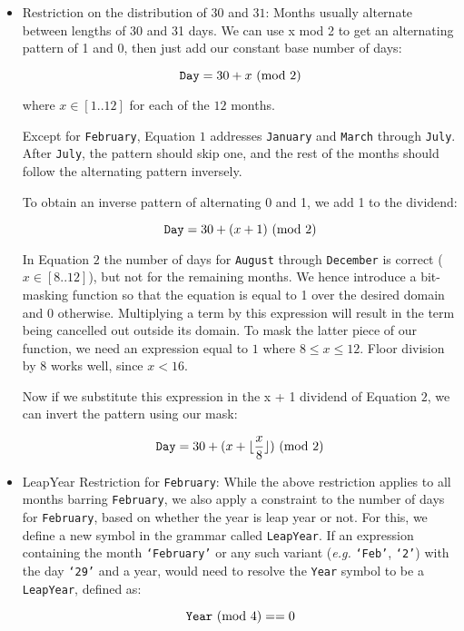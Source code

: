 \begin{itemize}
\item Restriction on the distribution of $30$ and $31$:
Months usually alternate between lengths of 30 and 31 days. We can use x mod 2 to get an alternating pattern of 1 and 0, then just add our constant base number of days:

\begin{equation}
\texttt{Day} = 30 + x \ (\text{mod}\ 2)
\end{equation}

where $x \in [1..12]$ for each of the $12$ months.

Except for \texttt{February}, Equation $1$ addresses \texttt{January} and \texttt{March} through \texttt{July}. After \texttt{July}, the pattern should skip one, and the rest of the months should follow the alternating pattern inversely.

To obtain an inverse pattern of alternating 0 and 1, we add 1 to the dividend:

\begin{equation}
\texttt{Day} = 30 + (x + 1) \ (\text{mod}\ 2)
\end{equation}

In Equation $2$ the number of days for \texttt{August} through \texttt{December} is correct ($x \in [8..12]$), but not for the remaining months. We hence introduce a bit-masking function so that the equation is equal to 1 over the desired domain and 0 otherwise. Multiplying a term by this expression will result in the term being cancelled out outside its domain. To mask the latter piece of our function, we need an expression equal to $1$ where $8 \le x\le 12$. Floor division by 8 works well, since $x < 16$.

Now if we substitute this expression in the x + 1 dividend of Equation $2$, we can invert the pattern using our mask:

\begin{equation}
\texttt{Day} = 30 + (x + \lfloor\frac{x}{8}\rfloor) \ (\text{mod}\ 2)
\end{equation}


\item LeapYear Restriction for \texttt{February}:
While the above restriction applies to all months barring \texttt{February}, we also apply a constraint to the number of days for \texttt{February}, based on whether the year is leap year or not. For this, we define a new symbol in the grammar called \texttt{LeapYear}. If an expression containing the month \texttt{`February'} or any such variant (\textit{e.g.} \texttt{`Feb'}, \texttt{`2'}) with the day \texttt{`29'} and a year, would need to resolve the \texttt{Year} symbol to be a \texttt{LeapYear}, defined as:

\begin{equation}
\texttt{Year} \ (\text{mod}\ 4) == 0
\end{equation}

\end{itemize}

